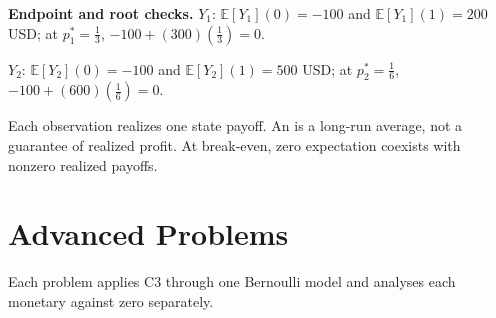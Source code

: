 \textbf{Endpoint and root checks.} $Y_1$: $\mathbb E[Y_1](0)=-100$ and $\mathbb E[Y_1](1)=200$ USD; at $p_1^*=\frac{1}{3}$, $-100+(300)(\frac{1}{3})=0$.

$Y_2$: $\mathbb E[Y_2](0)=-100$ and $\mathbb E[Y_2](1)=500$ USD; at $p_2^*=\frac{1}{6}$, $-100+(600)(\frac{1}{6})=0$.

Each observation realizes one state payoff. An  is a long-run average,
not a guarantee of realized profit. At break-even, zero expectation coexists with nonzero realized payoffs.
\clearpage
\section{Advanced Problems}\label{sec:t2-c3-advanced}
Each problem applies C3 through one Bernoulli model and analyses each monetary  against zero separately.
